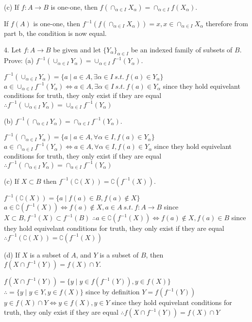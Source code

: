 (c) If $f: A \rightarrow B$ is one-one, then $f(\cap_{\alpha \in I}X_{\alpha}) = \cap_{\alpha \in I}f(X_{\alpha})$.

If $f(A)$ is one-one, then $f^{-1}(f(\cap_{\alpha \in I} X_{\alpha})) = x, x \in \cap_{\alpha \in I}X_{\alpha}$
therefore from part b, the condition is now equal.

4. Let $f: A \rightarrow B$ be given and let $\{ Y_{\alpha}\}_{\alpha \in I}$ be an indexed family of subsets of $B$. Prove:
(a) $f^{-1}(\cup_{\alpha \in I}Y_{\alpha}) = \cup_{\alpha \in I} f^{-1}(Y_{\alpha}) $.

$f^{-1}(\cup_{\alpha \in I} Y_{\alpha}) = \{a \mid a \in A, \exists\alpha \in I\ s.t.\  f(a) \in Y_{\alpha} \}$ 
$a \in \cup_{\alpha \in I} f^{-1}(Y_{\alpha}) \iff a \in A, \exists\alpha \in I\ s.t.\  f(a) \in Y_{\alpha} $
since they hold equivelant conditions for truth, they only exist if they are equal
$\therefore f^{-1}(\cup_{\alpha \in I}Y_{\alpha}) = \cup_{\alpha \in I} f^{-1}(Y_{\alpha})$

(b) $f^{-1}(\cap_{\alpha \in I}Y_{\alpha}) = \cap_{\alpha \in I} f^{-1}(Y_{\alpha}) $.


$f^{-1}(\cap_{\alpha \in I} Y_{\alpha}) = \{a \mid a \in A, \forall\alpha \in I, f(a) \in Y_{\alpha} \}$ 
$a \in \cap_{\alpha \in I} f^{-1}(Y_{\alpha}) \iff a \in A, \forall\alpha \in I, f(a) \in Y_{\alpha} $
since they hold equivelant conditions for truth, they only exist if they are equal
$\therefore f^{-1}(\cap_{\alpha \in I}Y_{\alpha}) = \cap_{\alpha \in I} f^{-1}(Y_{\alpha})$

(c) If $X \subset B$ then $f^{-1}(\complement(X)) = \complement(f^{-1}(X))$.


$f^{-1}(\complement(X)) = \{ a \mid f(a) \in B, f(a) \not \in X\}$
$a \in \complement(f^{-1}(X)) \iff f(a) \not \in X, a \in A\ s.t.\ f:A \rightarrow B$ since $X \subset B, f^{-1}(X) \subset f^{-1}(B)$
$\therefore a \in \complement(f^{-1}(X)) \iff f(a) \not \in X, f(a) \in B$
since they hold equivelant conditions for truth, they only exist if they are equal
$\therefore f^{-1}(\complement(X)) = \complement(f^{-1}(X))$

(d) If $X$ is a subset of $A$, and $Y$ is a subset of $B$, then $f(X \cap f^{-1}(Y)) = f(X) \cap Y$.

$f(X \cap f^{-1}(Y)) = \{ y \mid y \in f(f^{-1}(Y)), y \in f(X)\}$
$\therefore = \{y \mid y \in Y, y \in f(X)\}$ since by definition $Y =  f(f^{-1}(Y))$
$y \in f(X)\cap Y \iff y \in f(X), y \in Y$
since they hold equivelant conditions for truth, they only exist if they are equal
$\therefore f(X \cap f^{-1}(Y)) = f(X) \cap Y$

